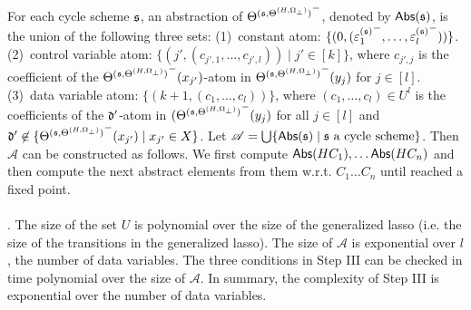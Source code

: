 For each cycle scheme ${\mathfrak{s} }$, an abstraction of ${\Theta^{({\mathfrak{s} }, \Theta^{(H,\Omega_\bot)})}}^-$, denoted by $\mathsf{Abs}({\mathfrak{s} })$,  is the union of the following three sets:
(1)~constant atom: $\{(0, ( {\varepsilon^{({\mathfrak{s} })}_{1}}^-,\dots, {\varepsilon^{({\mathfrak{s} })}_l}^-))\}$. 
(2)~control variable atom: $\{(j', (c_{j',1},\dots, c_{j', l})) \mid j' \in [k]\}$, where $c_{j', j}$ is the coefficient of the ${\Theta^{({\mathfrak{s} },\Theta^{(H,\Omega_\bot)})}}^-(x_{j'})$-atom in ${\Theta^{({\mathfrak{s} },\Theta^{(H,\Omega_\bot)})}}^-(y_{j})$ for $j\in[l]$. (3)~data variable atom: $\{(k+1, (c_1,\dots,c_l))\}$, where $(c_1,\dots,c_l) \in U^l$ is the coefficients of the $\mathfrak{d}'$-atom in ${(\Theta^{({\mathfrak{s} },\Theta^{(H,\Omega_\bot)})}}^-(y_{j})$ for all $j \in [l]$ and $\mathfrak{d}'\not\in \{{\Theta^{({\mathfrak{s} },\Theta^{(H,\Omega_\bot)})}}^-(x_{j'})\mid x_{j'}\in X\}$.
Let $\mathscr{A}=\bigcup \{\mathsf{Abs}({\mathfrak{s} }) \mid {\mathfrak{s} } \mbox{ a cycle scheme}\}$. Then $\mathscr{A}$ can be constructed as follows. We first compute $\mathsf{Abs}(HC_1), \ldots \mathsf{Abs}(HC_n)$ and then compute the next abstract elements from them w.r.t. $C_1\ldots C_n$ until reached a fixed point.\medskip\\
\smallskip\\

. The size of the set $U$ is polynomial over the size of the generalized lasso (i.e. the size of the transitions in the generalized lasso). The size of $\mathscr{A}$ is exponential over $l$, the number of data variables. The three conditions in Step III can be checked in time polynomial over the size of $\mathscr{A}$. In summary, the complexity of Step III is exponential over the number of data variables.



